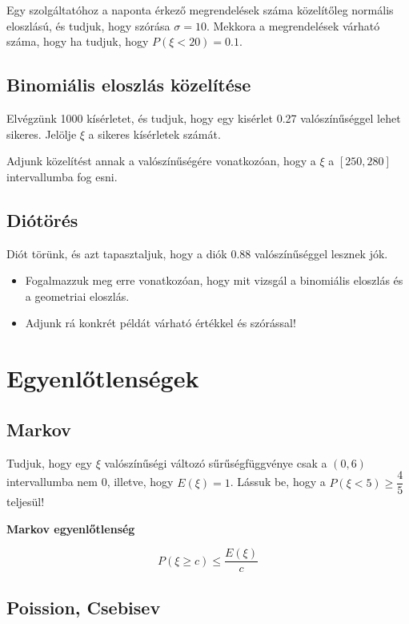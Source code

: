 \documentclass[a4paper]{article}
\begin{document}
Egy szolgáltatóhoz a naponta érkező megrendelések száma közelítőleg normális eloszlású, és tudjuk, hogy 
szórása $\sigma = 10$.
Mekkora a megrendelések várható száma, hogy ha tudjuk, hogy $P(\xi < 20) = 0.1$.

\subsection{Binomiális eloszlás közelítése}

Elvégzünk 1000 kísérletet, és tudjuk, hogy egy kisérlet 0.27 valószínűséggel lehet sikeres.
Jelölje $\xi$ a sikeres kísérletek számát.

\medskip

Adjunk közelítést annak a valószínűségére vonatkozóan, hogy a $\xi$ a $[250, 280]$ intervallumba fog esni.

\subsection{Diótörés}

Diót törünk, és azt tapasztaljuk, hogy a diók 0.88 valószínűséggel lesznek jók.

\medskip

\begin{itemize}
\item Fogalmazzuk meg erre vonatkozóan, hogy mit vizsgál a binomiális eloszlás és a geometriai eloszlás.
\item Adjunk rá konkrét példát várható értékkel és szórással!
\end{itemize}


\section{Egyenlőtlenségek}

\subsection{Markov}

Tudjuk, hogy egy $\xi$ valószínűségi változó sűrűségfüggvénye csak a $(0, 6)$ intervallumba nem 0, illetve, hogy $E(\xi) = 1$.
Lássuk be, hogy a $P(\xi < 5) \geq \dfrac{4}{5}$ teljesül!

\medskip

\textbf{Markov egyenlőtlenség}

\[
P(\xi \geq c) \leq \dfrac{E(\xi)}{c}
\]

\subsection{Poission, Csebisev}
\end{document}
